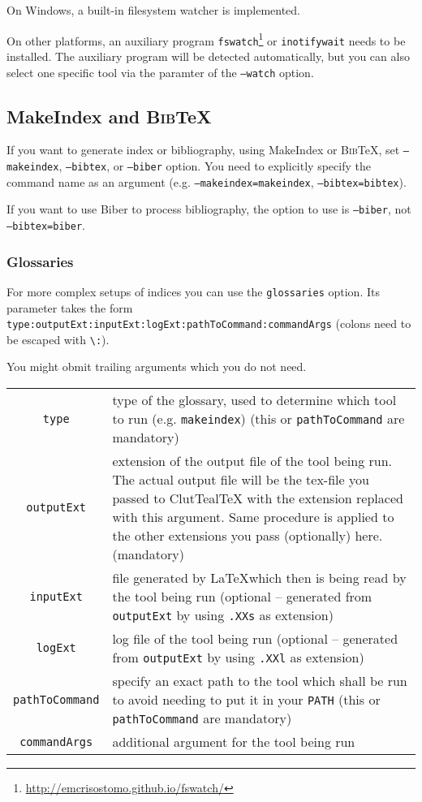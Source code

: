 \documentclass[a4paper, 11pt]{scrartcl}
\newcommand\CluttealTeX{ClutTeal\TeX\xspace}
\providecommand\BibTeX{\textsc{Bib}\TeX\xspace}
\begin{document}
On Windows, a built-in filesystem watcher is implemented.

On other platforms, an auxiliary program \texttt{fswatch}\footnote{\url{http://emcrisostomo.github.io/fswatch/}} or \texttt{inotifywait} needs to be installed.
The auxiliary program will be detected automatically, but you can also select one specific tool via the paramter of the \texttt{--watch} option.

\subsection{MakeIndex and \BibTeX}
If you want to generate index or bibliography, using MakeIndex or \BibTeX, set \texttt{--makeindex}, \texttt{--bibtex}, or \texttt{--biber} option.
You need to explicitly specify the command name as an argument (e.g. \texttt{--makeindex=makeindex}, \texttt{--bibtex=bibtex}).

If you want to use Biber to process bibliography, the option to use is \texttt{--biber}, not \texttt{--bibtex=biber}.

\subsubsection{Glossaries}
\label{sec:glossaries}
For more complex setups of indices you can use the \texttt{glossaries} option.
Its parameter takes the form
\texttt{type:outputExt:inputExt:logExt:pathToCommand:commandArgs} (colons
need to be escaped with \texttt{\textbackslash{}:}).

You might obmit trailing arguments which you do not need.

\begin{tabularx}{\linewidth}{cX}
	\texttt{type} &
	type of the glossary, used to determine which tool to run (e.g. \texttt{makeindex})
	\newline
	(this or \texttt{pathToCommand} are mandatory)
	\\
	\texttt{outputExt} &
	extension of the output file of the tool being run. The actual output file will
	be the tex-file you passed to \CluttealTeX{} with the extension replaced
	with this argument.
	\newline
	Same procedure is applied to the other extensions you pass (optionally) here.
	\newline
	(mandatory)
	\\
	\texttt{inputExt} &
	file generated by \LaTeX which then is being read by the tool being run
	\newline
	(optional -- generated from \texttt{outputExt} by using \texttt{.XXs} as extension)
	\\
	\texttt{logExt} &
	log file of the tool being run
	(optional -- generated from \texttt{outputExt} by using \texttt{.XXl} as extension)
	\\
	\texttt{pathToCommand} &
	specify an exact path to the tool which shall be run to avoid needing to
	put it in your \texttt{PATH}
	\newline
	(this or \texttt{pathToCommand} are mandatory)
	\\
	\texttt{commandArgs} &
	additional argument for the tool being run
\end{tabularx}
\end{document}
